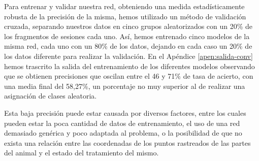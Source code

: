 Para entrenar y validar nuestra red, obteniendo una medida estadísticamente robusta de la precisión de la misma, hemos utilizado un método de validación cruzada, separando nuestros datos en cinco grupos aleatorizados con un 20\% de los fragmentos de sesiones cada uno. Así, hemos entrenado cinco modelos de la misma red, cada uno con un 80\% de los datos, dejando en cada caso un 20\% de los datos diferente para realizar la validación. En el Apéndice \ref{apen:salida-conv} hemos trascrito la salida del entrenamiento de los diferentes modelos observando que se obtienen precisiones que oscilan entre el 46 y 71\% de tasa de acierto, con una media final del 58,27\%, un porcentaje no muy superior al de realizar una asignación de clases aleatoria.

Esta baja precisión puede estar causada por diversos factores, entre los cuales pueden estar la poca cantidad de datos de entrenamiento, el uso de una red demasiado genérica y poco adaptada al problema, o la posibilidad de que no exista una relación entre las coordenadas de los puntos rastreados de las partes del animal y el estado del tratamiento del mismo.
